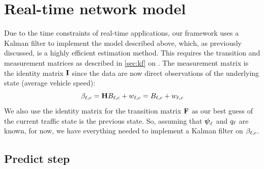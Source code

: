 \section{Real-time network model}
\label{sec:nw_realtime}

Due to the time constraints of real-time applications, our framework uses a Kalman filter to implement the model described above, which, as previously discussed, is a highly efficient estimation method. This requires the transition and measurement matrices as described in \cref{sec:kf} on . The measurement matrix is the identity matrix $\mathbf{I}$ since the data are now direct observations of the underlying state (average vehicle speed):
\begin{equation}
\label{eq:kf_meas_identity}
\beta_{\ell,c} = \mathbf{H}B_{\ell,c} + w_{\ell,c} = B_{\ell,c} + w_{\ell,c}
\end{equation}
We also use the identity matrix for the transition matrix $\mathbf{F}$ as our best guess of the current traffic state is the previous state. So, assuming that $\mathbf{\boldsymbol{\psi}}_{\ell}$ and $q_{\ell}$ are known, for now, we have everything needed to implement a Kalman filter on $\beta_{\ell,c}$.


\subsection{Predict step}
\label{sec:kf_predict}

